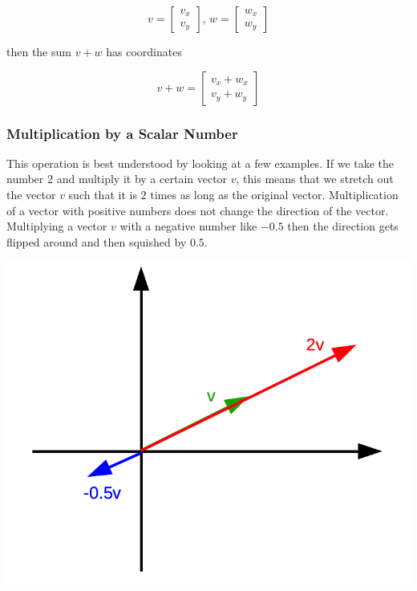 \documentclass[
]{book}
\theoremstyle{definition}
\theoremstyle{definition}
\theoremstyle{definition}
\theoremstyle{remark}
\begin{document}
\[v = \left[\begin{array}{c} v_x \\ v_y \end{array}\right] \text{, } w = \left[\begin{array}{c} w_x \\ w_y \end{array}\right]\]

then the sum \(v+w\) has coordinates

\[v+w =  \left[\begin{array}{c} v_x + w_x \\ v_y+w_y \end{array}\right]\]

\hypertarget{intro-linalg-vector-scalar-multiplication}{%
\subsubsection{Multiplication by a Scalar Number}\label{intro-linalg-vector-scalar-multiplication}}

This operation is best understood by looking at a few examples. If we take the number \(2\) and multiply it by a certain vector \(v\), this means that we stretch out the vector \(v\) such that it is \(2\) times as long as the original vector. Multiplication of a vector with positive numbers does not change the direction of the vector. Multiplying a vector \(v\) with a negative number like \(-0.5\) then the direction gets flipped around and then squished by \(0.5\).

\includegraphics[width=10.58in]{odg/vector-scalar-multiplication}
\end{document}
